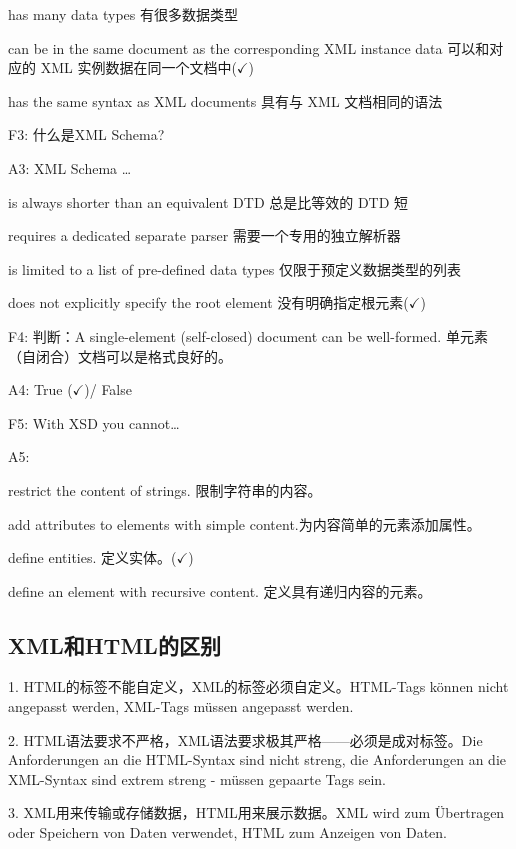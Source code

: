 \documentclass[fontset=windows]{article}
\begin{document}
\indent\indent has many data types 有很多数据类型

\indent\indent can be in the same document as the corresponding XML instance data 可以和对应的 XML 实例数据在同一个文档中($\checkmark$)

\indent\indent has the same syntax as XML documents 具有与 XML 文档相同的语法

F3: 什么是XML Schema?

A3: XML Schema \dots

\indent\indent is always shorter than an equivalent DTD 总是比等效的 DTD 短

\indent\indent requires a dedicated separate parser 需要一个专用的独立解析器

\indent\indent is limited to a list of pre-defined data types 仅限于预定义数据类型的列表

\indent\indent does not explicitly specify the root element 没有明确指定根元素($\checkmark$)

F4: 判断：A single-element (self-closed) document can be well-formed. 单元素（自闭合）文档可以是格式良好的。

A4: True ($\checkmark$)/ False

F5: With XSD you cannot\dots

A5: 

\indent\indent restrict the content of strings. 限制字符串的内容。

\indent\indent add attributes to elements with simple content.为内容简单的元素添加属性。

\indent\indent define entities. 定义实体。($\checkmark$)

\indent\indent define an element with recursive content. 定义具有递归内容的元素。

\subsection{XML和HTML的区别}

1. HTML的标签不能自定义，XML的标签必须自定义。HTML-Tags können nicht angepasst werden, XML-Tags müssen angepasst werden.

2. HTML语法要求不严格，XML语法要求极其严格——必须是成对标签。Die Anforderungen an die HTML-Syntax sind nicht streng, die Anforderungen an die XML-Syntax sind extrem streng - müssen gepaarte Tags sein.

3. XML用来传输或存储数据，HTML用来展示数据。XML wird zum Übertragen oder Speichern von Daten verwendet, HTML zum Anzeigen von Daten.
\end{document}
